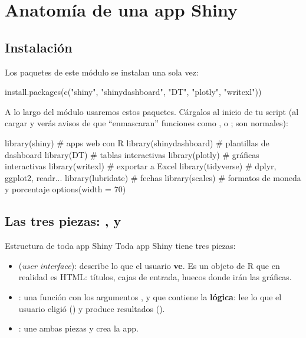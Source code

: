 \section{Anatomía de una app Shiny}
\label{sec:m6-anatomia}

\subsection{Instalación}

Los paquetes de este módulo se instalan una sola vez:

\begin{rnoejecutar}
install.packages(c("shiny", "shinydashboard", "DT", "plotly", "writexl"))
\end{rnoejecutar}

A lo largo del módulo usaremos estos paquetes. Cárgalos al inicio de tu
script (al cargar  y  verás avisos de que
``enmascaran'' funciones como ,  o
; son normales):

\begin{rcode}
library(shiny)            # apps web con R
library(shinydashboard)   # plantillas de dashboard
library(DT)               # tablas interactivas
library(plotly)           # gráficas interactivas
library(writexl)          # exportar a Excel
library(tidyverse)        # dplyr, ggplot2, readr...
library(lubridate)        # fechas
library(scales)           # formatos de moneda y porcentaje
options(width = 70)
\end{rcode}

\subsection{Las tres piezas: \texorpdfstring{,  y }{ui, server y shinyApp()}}

\begin{concepto}{Estructura de toda app Shiny}
Toda app Shiny tiene tres piezas:
\begin{itemize}
  \item {} (\emph{user interface}): describe lo que el usuario
        \textbf{ve}. Es un objeto de R que en realidad es HTML: títulos,
        cajas de entrada, huecos donde irán las gráficas.
  \item {}: una función con los argumentos ,
         y  que contiene la \textbf{lógica}:
        lee lo que el usuario eligió () y produce
        resultados ().
  \item {}: une ambas piezas y crea la app.
\end{itemize}
\end{concepto}

